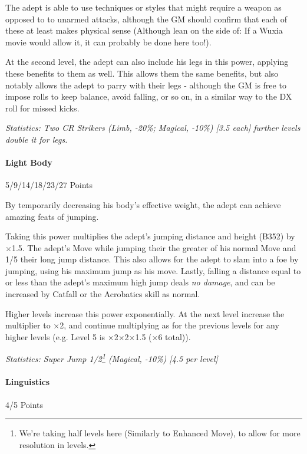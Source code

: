 \begin{multicols}{3}
		The adept is able to use techniques or styles that might require a weapon as opposed to to unarmed attacks, although the GM should confirm that each of these at least makes physical sense (Although lean on the side of: If a Wuxia movie would allow it, it can probably be done here too!).
		
		At the second level, the adept can also include his legs in this power, applying these benefits to them as well. This allows them the same benefits, but also notably allows the adept to parry with their legs - although the GM is free to impose rolls to keep balance, avoid falling, or so on, in a similar way to the DX roll for missed kicks.

		\textcolor{OliveGreen}{\textit{Statistics: Two CR Strikers (Limb, -20\%; Magical, -10\%) [3.5 each] further levels double it for legs. }}
	
	\paragraph{Light Body}
	\begin{flushright}
		5/9/14/18/23/27 Points
	\end{flushright}

		By temporarily decreasing his body's effective weight, the adept can achieve amazing feats of jumping.
		
		Taking this power multiplies the adept's jumping distance and height (B352) by $\times$1.5. The adept's Move while jumping their the greater of his normal Move and 1/5 their long jump distance. This also allows for the adept to slam into a foe by jumping, using his maximum jump as his move. Lastly, falling a distance equal to or less than the adept's maximum high jump deals \textit{no damage}, and can be increased by Catfall or the Acrobatics skill as normal.
		
		Higher levels increase this power exponentially. At the next level increase the multiplier to $\times$2, and continue multiplying as for the previous levels for any higher levels (e.g. Level 5 is $\times$2$\times$2$\times$1.5 ($\times$6 total)).

		\textcolor{OliveGreen}{\textit{Statistics: Super Jump 1/2\footnote{We're taking half levels here (Similarly to Enhanced Move), to allow for more resolution in levels.} (Magical, -10\%) [4.5 per level]}}

	\paragraph{Linguistics}
	\begin{flushright}
		4/5 Points
	\end{flushright}


\end{multicols}
